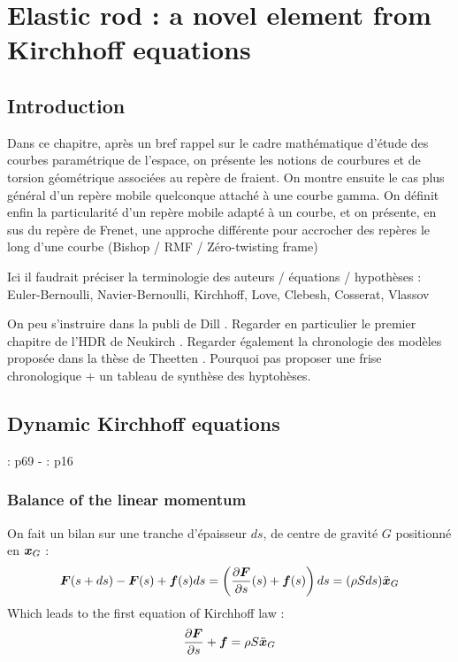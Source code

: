 \chapter{Elastic rod : a novel element from Kirchhoff equations}

\section{Introduction}
Dans ce chapitre, après un bref rappel sur le cadre mathématique d'étude des courbes paramétrique de l'espace, on présente les notions de courbures et de torsion géométrique associées au repère de fraient. On montre ensuite le cas plus général d'un repère mobile quelconque attaché à une courbe gamma. On définit enfin la particularité d'un repère mobile adapté à un courbe, et on présente, en sus du repère de Frenet, une approche différente pour accrocher des repères le long d'une courbe (Bishop / RMF / Zéro-twisting frame)

Ici il faudrait préciser la terminologie des auteurs / équations / hypothèses :
Euler-Bernoulli, Navier-Bernoulli, Kirchhoff, Love, Clebesh, Cosserat, Vlassov

On peu s'instruire dans la publi de Dill \cite{Dill1992}.
Regarder en particulier le premier chapitre de l'HDR de Neukirch \cite{Neukirch2009}.
Regarder également la chronologie des modèles proposée dans la thèse de Theetten \cite{Theetten2007}.
Pourquoi pas proposer une frise chronologique + un tableau de synthèse des hyptohèses.

\cite{Dill1992}
\cite{Neukirch2009}
\cite{Adriaenssens1999}
\cite{Hoogenboom2006}
\cite{Lang2009}
\cite{Spillmann2008}

\section{Dynamic Kirchhoff equations}
\cite{Neukirch2009} : p69 - \cite{Dill1992} : p16

\subsection{Balance of the linear momentum}
On fait un bilan sur une tranche d'épaisseur $ds$, de centre de gravité $G$ positionné en $\boldsymbol{x}_G$ :
\begin{equation}
	\boldsymbol{F}(s+ds)-\boldsymbol{F}(s) + \boldsymbol{f}(s)ds = \left(\frac{\partial \boldsymbol{F}}{\partial s}(s)+\boldsymbol{f}(s)\right)ds = (\rho Sds)\ddot{\boldsymbol{x}}_G
\end{equation}
Which leads to the first equation of Kirchhoff law :
\begin{equation}
	\frac{\partial \boldsymbol{F}}{\partial s}+\boldsymbol{f} = \rho S \ddot{\boldsymbol{x}}_G
\end{equation}

